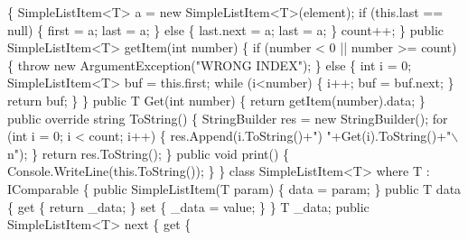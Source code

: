 \begin{DoxyCode}
        \{
            SimpleListItem<T> a = \textcolor{keyword}{new} SimpleListItem<T>(element);
            \textcolor{keywordflow}{if} (this.last == null)
            \{
                first = a;
                last = a;
            \}
            \textcolor{keywordflow}{else}
            \{
                last.next = a;
                last = a;
            \}
            count++;
        \}
        \textcolor{keyword}{public} SimpleListItem<T> getItem(\textcolor{keywordtype}{int} number)
        \{
            \textcolor{keywordflow}{if} (number < 0 || number >= count)
            \{
                \textcolor{keywordflow}{throw} \textcolor{keyword}{new} ArgumentException(\textcolor{stringliteral}{"WRONG INDEX"});
            \}
            \textcolor{keywordflow}{else}
            \{
                \textcolor{keywordtype}{int} i = 0;
                SimpleListItem<T> buf = this.first;
                \textcolor{keywordflow}{while} (i<number)
                \{
                    i++;
                    buf = buf.next;
                \}
                \textcolor{keywordflow}{return} buf;
            \}
        \}
        \textcolor{keyword}{public} T Get(\textcolor{keywordtype}{int} number)
        \{
            \textcolor{keywordflow}{return} getItem(number).data;
        \}
        \textcolor{keyword}{public} \textcolor{keyword}{override} \textcolor{keywordtype}{string} ToString()
        \{
            StringBuilder res = \textcolor{keyword}{new} StringBuilder();
            \textcolor{keywordflow}{for} (\textcolor{keywordtype}{int} i = 0; i < count; i++)
            \{
                res.Append(i.ToString()+\textcolor{stringliteral}{") "}+Get(i).ToString()+\textcolor{stringliteral}{"\(\backslash\)n"});
            \}
            \textcolor{keywordflow}{return} res.ToString();
        \}
        \textcolor{keyword}{public} \textcolor{keywordtype}{void} print()
        \{
            Console.WriteLine(this.ToString());
        \}
    \}
    \textcolor{keyword}{class }SimpleListItem<T>
        where T : IComparable
    \{
        \textcolor{keyword}{public} SimpleListItem(T param)
        \{
            data = param;
        \}
        \textcolor{keyword}{public} T data
        \{
            \textcolor{keyword}{get}
            \{
                \textcolor{keywordflow}{return} \_data;
            \}
            \textcolor{keyword}{set}
            \{
                \_data = value;
            \}
        \}
        T \_data;
        \textcolor{keyword}{public} SimpleListItem<T> next
        \{
            \textcolor{keyword}{get}
            \{

\end{DoxyCode}
